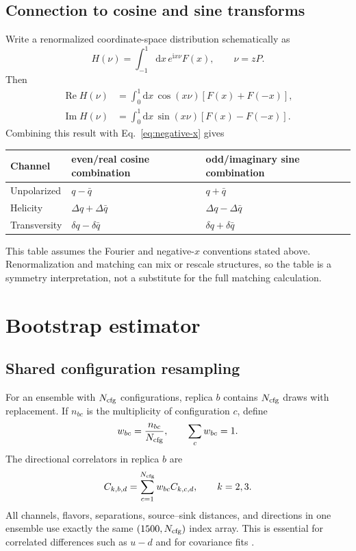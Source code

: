 \documentclass[11pt]{article}
\numberwithin{equation}{section}
\newcommand{\ii}{\mathrm{i}}
\newcommand{\dd}{\mathrm{d}}
\begin{document}
\subsection{Connection to cosine and sine transforms}

Write a renormalized coordinate-space distribution schematically as
\begin{equation}
  H(\nu)=\int_{-1}^{1}\dd x\,e^{\ii x\nu}F(x),
  \qquad \nu=zP.
  \label{eq:ioffe-transform}
\end{equation}
Then
\begin{align}
  \operatorname{Re}H(\nu)
  &=\int_0^1\dd x\,\cos(x\nu)[F(x)+F(-x)],
  \\
  \operatorname{Im}H(\nu)
  &=\int_0^1\dd x\,\sin(x\nu)[F(x)-F(-x)].
  \label{eq:cosine-sine}
\end{align}
Combining this result with Eq.~\eqref{eq:negative-x} gives
\begin{center}
\begin{tabular}{lll}
\toprule
Channel & even/real cosine combination & odd/imaginary sine combination\\
\midrule
Unpolarized & $q-\bar q$ & $q+\bar q$\\
Helicity & $\Delta q+\Delta\bar q$ & $\Delta q-\Delta\bar q$\\
Transversity & $\delta q-\delta\bar q$ & $\delta q+\delta\bar q$\\
\bottomrule
\end{tabular}
\end{center}
This table assumes the Fourier and negative-$x$ conventions stated above.
Renormalization and matching can mix or rescale structures, so the table is a
symmetry interpretation, not a substitute for the full matching calculation.

\section{Bootstrap estimator}

\subsection{Shared configuration resampling}

For an ensemble with $N_{\rm cfg}$ configurations, replica $b$ contains
$N_{\rm cfg}$ draws with replacement.  If $n_{bc}$ is the multiplicity of
configuration $c$, define
\begin{equation}
  w_{bc}=\frac{n_{bc}}{N_{\rm cfg}},
  \qquad \sum_c w_{bc}=1.
  \label{eq:bootstrap-weights}
\end{equation}
The directional correlators in replica $b$ are
\begin{equation}
  C_{k,b,d}=\sum_{c=1}^{N_{\rm cfg}}w_{bc}C_{k,c,d},
  \qquad k=2,3.
  \label{eq:bootstrap-linear}
\end{equation}
All channels, flavors, separations, source--sink distances, and directions in
one ensemble use exactly the same $(1500,N_{\rm cfg})$ index array.  This is
essential for correlated differences such as $u-d$ and for covariance fits
\cite{EfronTibshirani1993}.
\end{document}
